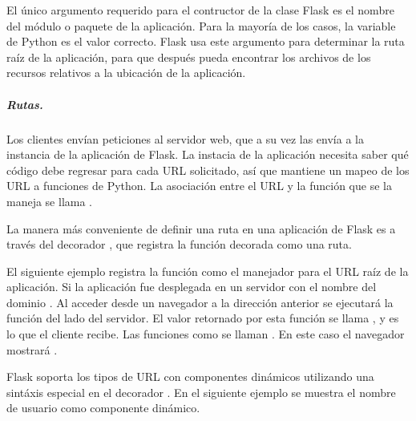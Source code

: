 El único argumento requerido para el contructor de la clase Flask es el nombre
del módulo o paquete de la aplicación. Para la mayoría de los casos,
la variable de Python  es el valor correcto. Flask usa este argumento
para determinar la ruta raíz de la aplicación, para que después pueda encontrar
los archivos de los recursos relativos a la ubicación de la aplicación.


\subparagraph{Rutas.}
\label{\detokenize{chapter_two/desc_cloudnao:rutas}}
Los clientes envían peticiones al servidor web, que a su vez las envía a la
instancia de la aplicación de Flask. La instacia de la aplicación necesita saber
qué código debe regresar para cada URL solicitado, así que mantiene un mapeo de
los URL a funciones de Python. La asociación entre el URL y la función que se
la maneja se llama .

La manera más conveniente de definir una ruta en una aplicación de Flask es
a través del decorador , que registra la función decorada como
una ruta.

El siguiente ejemplo registra la función  como el manejador para el URL
raíz de la aplicación. Si la aplicación fue desplegada en un servidor con el
nombre del dominio . Al acceder desde un navegador a
la dirección anterior se ejecutará la función  del lado del servidor.
El valor
retornado por esta función se llama , y es lo que el cliente recibe.
Las funciones como  se llaman .
En este caso el navegador mostrará .

\begin{sphinxVerbatim}[commandchars=\\\{\}]
 
   
\end{sphinxVerbatim}

Flask soporta los tipos de URL con componentes dinámicos utilizando
una sintáxis especial en el decorador . En el siguiente ejemplo se
muestra el nombre de usuario como componente dinámico.

\begin{sphinxVerbatim}[commandchars=\\\{\}]
 
   
\end{sphinxVerbatim}

